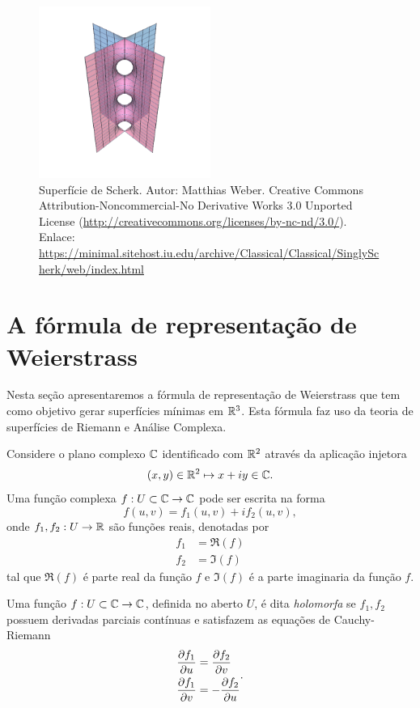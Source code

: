 \begin{figure}
	\centering
	\includegraphics[width=0.5\textwidth]{images/scherk}
	\caption{Superfície de Scherk. Autor: Matthias Weber. Creative Commons Attribution-Noncommercial-No Derivative Works 3.0 Unported License (\url{http://creativecommons.org/licenses/by-nc-nd/3.0/}). Enlace: \url{https://minimal.sitehost.iu.edu/archive/Classical/Classical/SinglyScherk/web/index.html}}
\end{figure}

\section{A fórmula de representação de Weierstrass}
Nesta seção apresentaremos a fórmula de representação de Weierstrass que tem como objetivo gerar superfícies mínimas em $\mathbb{R}^3$. Esta fórmula faz uso da teoria de superfícies de Riemann e Análise Complexa.

Considere o plano complexo $\mathbb{C}$ identificado com $\mathbb{R}^2$ através da aplicação injetora 
\begin{equation*}
(x,y) \in \mathbb{R}^2 \mapsto x + iy \in \mathbb{C}.
\end{equation*}
Uma função complexa $f: U \subset \mathbb{C} \rightarrow \mathbb{C}$ pode ser escrita na forma
\begin{equation*}
f(u,v) = f_1(u,v) + i f_2(u,v),
\end{equation*}
onde $f_1, f_2: U \rightarrow \mathbb{R}$ são funções reais, denotadas por
\begin{align*}
f_1 &= \Re(f)\\
f_2 &= \Im(f)
\end{align*}
tal que $\Re(f)$ é parte real da função $f$ e $\Im(f)$ é a parte imaginaria da função $f$.
\begin{definicao}
	Uma função $f: U \subset \mathbb{C} \rightarrow \mathbb{C}$, definida no aberto $U$, é dita \emph{holomorfa} se $f_1, f_2$ possuem derivadas parciais contínuas e satisfazem as equações de Cauchy-Riemann
	\begin{equation*}
		\begin{split}
		\frac{\partial f_1}{\partial u} &= \frac{\partial f_2}{\partial v}\\
		\frac{\partial f_1}{\partial v} &= - \frac{\partial f_2}{\partial u}
		\end{split}.
	\end{equation*}

\end{definicao}

